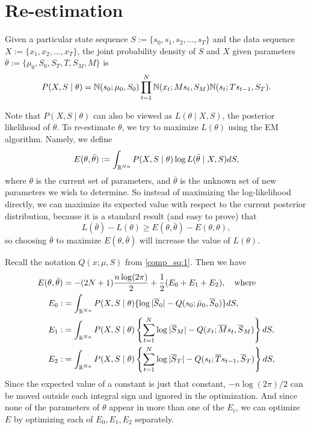 \documentclass[12pt,leqno]{article}
\begin{document}
\section{Re-estimation}
Given a particular state sequence $S := \{s_0,s_1,s_2,\dots,s_T\}$ and the data sequence $X := \{x_1,x_2,\dots,x_T\}$,
the joint probability density of $S$ and $X$ given parameters $\theta := \{\mu_0,S_0,S_T,T,S_M,M\}$ is
$$
P(X,S\mid\theta) = {\mathbb N}(s_0;\mu_0,S_0)\prod_{t=1}^N{\mathbb N}(x_t;Ms_t,S_M){\mathbb N}(s_t;Ts_{t-1},S_T).
$$

Note that $P(X,S\mid\theta)$ can also be viewed as  $L(\theta\mid X,S)$, the posterior likelihood of $\theta$.
To re-estimate $\theta$, we try to maximize $L(\theta)$ using the EM algorithm. Namely, we define 
$$
E(\theta,\bar{\theta}) := \int_{{\mathbb R}^{Nn}}P(X,S\mid\theta)\log{L(\bar{\theta}\mid X,S)}dS,
$$
where $\theta$ is the current set of parameters, and $\bar{\theta}$ is the unknown set of new parameters
we wish to determine. So instead of maximizing the log-likelihood directly, we can maximize its expected
value with respect to the current posterior distribution, because it is a standard result \cite{Dempster}
(and easy to prove) that
$$
L(\bar{\theta}) - L(\theta) \ge E(\theta,\bar{\theta}) - E(\theta,\theta),
$$
so choosing $\bar{\theta}$ to maximize $E(\theta,\bar{\theta})$ will increase the value of $L(\theta)$.


  
Recall the notation $Q(x;\mu,S)$ from \eqref{comp_sq:1}.  Then we have
\begin{align}
  E(\theta,\bar{\theta}) &= -(2N+1)\frac{n\log(2\pi)}{2} + \frac{1}{2}(E_0 + E_1 + E_2),\quad\text{where}\notag\\
  E_0 :&=\int_{{\mathbb R}^{Nn}}P(X,S\mid\theta)\{\log|\overline{S}_0| - Q(s_0;\bar{\mu}_0,\overline{S}_0)\}dS,\label{E0}\\
  E_1 :&= \int_{{\mathbb R}^{Nn}}P(X,S\mid\theta)\left\{\sum_{t=1}^N\log|\overline{S}_M| - Q(x_t;\overline{M}s_t,\overline{S}_M)\right\}dS,
\label{E1}\\
E_2 :&= \int_{{\mathbb R}^{Nn}}P(X,S\mid\theta)\left\{\sum_{t=1}^N\log|\overline{S}_T| - Q(s_t;\overline{T}s_{t-1},\overline{S}_T)\right\}dS,
\label{E2}
\end{align}
Since the expected value of a constant is just that constant, $-n\log(2\pi)/2$ can be moved outside each
integral sign and ignored in the optimization.  And since none of the parameters of $\theta$ appear in more
than one of the $E_i$, we can optimize $E$ by optimizing each of $E_0,E_1,E_2$ separately.
\end{document}
